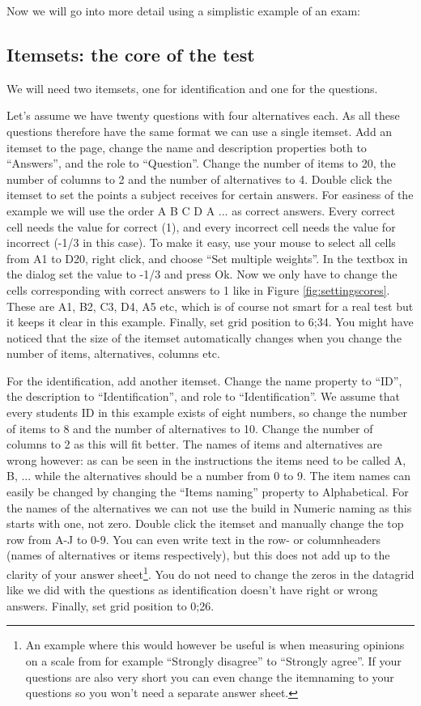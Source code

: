 \documentclass[10pt,a4paper]{article}
\begin{document}
Now we will go into more detail using a simplistic example of an exam:

\subsection*{Itemsets: the core of the test}

We will need two itemsets, one for identification and one for the questions.

Let's assume we have twenty questions with four alternatives each. As all these questions therefore have the same format we can use a single itemset. Add an itemset to the page, change the name and description properties both to ``Answers'', and the role to ``Question''. Change the number of items to 20, the number of columns to 2 and the number of alternatives to 4. Double click the itemset to set the points a subject receives for certain answers. For easiness of the example we will use the order A B C D A ... as correct answers. Every correct cell needs the value for correct (1), and every incorrect cell needs the value for incorrect (-1/3 in this case). To make it easy, use your mouse to select all cells from A1 to D20, right click, and choose ``Set multiple weights''. In the textbox in the dialog set the value to -1/3 and press Ok. Now we only have to change the cells corresponding with correct answers to 1 like in Figure \ref{fig:settingscores}. These are A1, B2, C3, D4, A5 etc, which is of course not smart for a real test but it keeps it clear in this example. Finally, set grid position to 6;34. You might have noticed that the size of the itemset automatically changes when you change the number of items, alternatives, columns etc.

For the identification, add another itemset. Change the name property to ``ID'', the description to ``Identification'', and role to ``Identification''. We assume that every students ID in this example exists of eight numbers, so change the number of items to 8 and the number of alternatives to 10. Change the number of columns to 2 as this will fit better. The names of items and alternatives are wrong however: as can be seen in the instructions the items need to be called A, B, ... while the alternatives should be a number from 0 to 9. The item names can easily be changed by changing the ``Items naming'' property to Alphabetical. For the names of the alternatives we can not use the build in Numeric naming as this starts with one, not zero. Double click the itemset and manually change the top row from A-J to 0-9. You can even write text in the row- or columnheaders (names of alternatives or items respectively), but this does not add up to the clarity of your answer sheet\footnote{An example where this would however be useful is when measuring opinions on a scale from for example ``Strongly disagree'' to ``Strongly agree''. If your questions are also very short you can even change the itemnaming to your questions so you won't need a separate answer sheet.}. You do not need to change the zeros in the datagrid like we did with the questions as identification doesn't have right or wrong answers. Finally, set grid position to 0;26.
\end{document}
